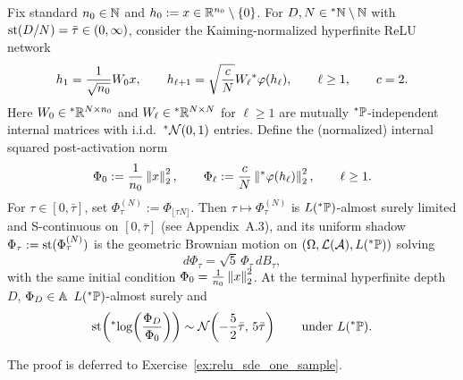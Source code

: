 \begin{proposition}\label{prop:relu_sde_one_sample}
Fix standard $n_0 \in \mathbb{N}$ and $h_0 := x \in \mathbb{R}^{n_0} \setminus \{0\}$. For $D, N \in {}^*\mathbb{N} \setminus \mathbb{N}$ with $\operatorname{st}(D/N) = \bar{\tau} \in (0, \infty)$, consider the Kaiming-normalized hyperfinite ReLU network
\begin{equation}\label{eq:kaiming_relu_net}
h_1 = \frac{1}{\sqrt{n_0}} W_0 x, \qquad h_{\ell+1} = \sqrt{\frac{c}{N}} W_\ell {}^*\varphi(h_\ell), \qquad \ell \ge 1, \qquad c = 2.
\end{equation}
Here $W_0 \in {}^*\mathbb{R}^{N \times n_0}$ and $W_\ell \in {}^*\mathbb{R}^{N \times N}$ for $\ell \ge 1$ are mutually ${}^*\mathbb{P}$-independent internal matrices with i.i.d.\ ${}^*\mathcal{N}(0, 1)$ entries. Define the (normalized) internal squared post-activation norm
\begin{equation}\label{eq:kaiming_relu_phi}
\Phi_0 := \frac{1}{n_0}\left\lVert x \right\rVert_2^2, \qquad \Phi_\ell := \frac{c}{N}\left\lVert {}^*\varphi(h_\ell) \right\rVert_2^2, \qquad \ell \ge 1.
\end{equation}
For $\tau \in [0, \bar{\tau}]$, set $\Phi_\tau^{(N)} := \Phi_{\lfloor \tau N \rfloor}$. Then $\tau \mapsto \Phi_\tau^{(N)}$ is $L({}^*\mathbb{P})$-almost surely limited and S-continuous on $[0, \bar{\tau}]$ (see Appendix~A.3), and its uniform shadow $\Phi_\tau := \operatorname{st}(\Phi_\tau^{(N)})$ is the geometric Brownian motion on $(\Omega, \mathcal{L}(\mathcal{A}), L({}^*\mathbb{P}))$ solving
\begin{equation}\label{eq:relu_gbm}
d\Phi_\tau = \sqrt{5}\,\Phi_\tau\,dB_\tau,
\end{equation}
with the same initial condition $\Phi_0 = \frac{1}{n_0}\left\lVert x \right\rVert_2^2$. At the terminal hyperfinite depth $D$, $\Phi_D \in \mathbb{A}$ $L({}^*\mathbb{P})$-almost surely and
\begin{equation}\label{eq:relu_terminal_log}
\operatorname{st}\!\left({}^*\!\log\!\left(\frac{\Phi_D}{\Phi_0}\right)\right) \sim \mathcal{N}\!\left(-\frac{5}{2}\bar{\tau},\, 5\bar{\tau}\right) \qquad \text{under } L({}^*\mathbb{P}).
\end{equation}
\end{proposition}

The proof is deferred to Exercise~\ref{ex:relu_sde_one_sample}.

